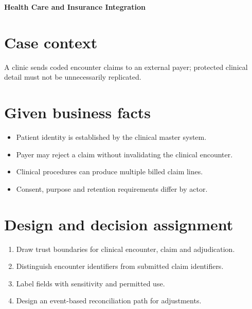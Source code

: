 \documentclass[11pt,letterpaper]{article}
\begin{document}
\begin{center}
{\LARGE\bfseries\color{navy} Health Care and Insurance Integration}\par
\vspace{0.25em}{\large Scenario-based enterprise case study}\par
{}
\end{center}
\vspace{0.8em}
\section{Case context}
A clinic sends coded encounter claims to an external payer; protected clinical detail must not be unnecessarily replicated.


\section{Given business facts}
\begin{itemize}
\item Patient identity is established by the clinical master system.
\item Payer may reject a claim without invalidating the clinical encounter.
\item Clinical procedures can produce multiple billed claim lines.
\item Consent, purpose and retention requirements differ by actor.
\end{itemize}

\section{Design and decision assignment}
\begin{enumerate}
\item Draw trust boundaries for clinical encounter, claim and adjudication.
\item Distinguish encounter identifiers from submitted claim identifiers.
\item Label fields with sensitivity and permitted use.
\item Design an event-based reconciliation path for adjustments.
\end{enumerate}
\end{document}
